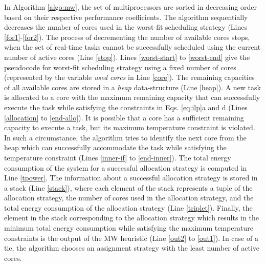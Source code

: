 \documentclass[conference]{IEEEtran}
\begin{document}
In Algorithm \ref{algo:mw},
the set of multiprocessors are sorted in decreasing order based on their respective performance coefficients.
The algorithm sequentially decreases the number of cores used in the worst-fit scheduling strategy (Lines \ref{for1}-\ref{for2}). 
The process of decrementing the number of available cores stops, when the set of real-time tasks cannot be successfully scheduled using 
the current number of active cores (Line \ref{stop}). %
Lines \ref{worst-start} to \ref{worst-end} give the pseudocode for worst-fit scheduling strategy using a fixed number of cores 
(represented by the variable \emph{used cores} in Line \ref{core}).
The remaining capacities of all available cores are stored in a \emph{heap} data-structure (Line \ref{heap}).
A new task is allocated to a core with the maximum remaining capacity 
that can successfully execute the task while satisfying the constraints in Eqs. \ref{eq:ilp}a and d (Lines \ref{allocation} to \ref{end-allo}).
It is possible that a core has a sufficient remaining capacity to execute a task, but its maximum temperature constraint 
is violated. In such a circumstance, the algorithm tries to identify the next core from the heap which can successfully accommodate the task
while satisfying the temperature constraint (Lines \ref{inner-if} to \ref{end-inner}). 
The total energy consumption of the system for a successful allocation strategy is computed in Line \ref{tpower}.
The information about a successful allocation strategy is stored in a stack (Line \ref{stack}), where
each element of the stack represents a tuple of the allocation strategy,  the 
number of cores used in the allocation strategy, and the total energy consumption of the allocation strategy (Line \ref{triplet}).
Finally, the element in the stack corresponding to the allocation strategy which results in the minimum total energy consumption
while satisfying the maximum temperature constraints is the output of the MW heuristic (Line \ref{out2} to \ref{out1}).
In case of a tie, the algorithm chooses an assignment strategy with the least number of active cores.
\end{document}
